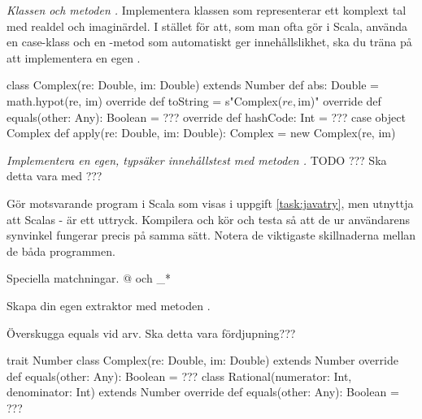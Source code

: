 \Subtask \emph{Klassen  och metoden .} Implementera klassen  som representerar ett komplext tal med realdel och imaginärdel. I stället för att, som man ofta gör i Scala, använda en case-klass och en -metod som automatiskt ger innehållslikhet, ska du träna på att implementera en egen .

\begin{Code}
class Complex(re: Double, im: Double) extends Number {
  def abs: Double = math.hypot(re, im)
  override def toString = s"Complex($re, $im)"
  override def equals(other: Any): Boolean = ???
  override def hashCode: Int  = ???
}
case object Complex {
  def apply(re: Double, im: Double): Complex = new Complex(re, im)
}
\end{Code}

\Task \emph{Implementera en egen, typsäker innehållstest med metoden \code{===}.} TODO ??? Ska detta vara med ???

\ExtraTasks %

\Task Gör motsvarande program i Scala som visas i uppgift \ref{task:javatry}, men utnyttja att Scalas - är ett uttryck. Kompilera och kör och testa så att de ur användarens synvinkel fungerar precis på samma sätt. Notera de viktigaste skillnaderna mellan de båda programmen.

\AdvancedTasks %

\Task Speciella matchningar.  @ och \_*

\Task \label{task:extractor} Skapa din egen extraktor med metoden .

\Task Överskugga equals vid arv. Ska detta vara fördjupning???     

\begin{Code}
trait Number
class Complex(re: Double, im: Double) extends Number {
  override def equals(other: Any): Boolean = ???
}
class Rational(numerator: Int, denominator: Int) extends Number {
  override def equals(other: Any): Boolean = ???
}
\end{Code}
    